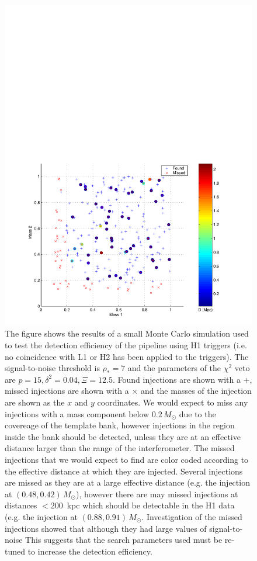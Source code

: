 \begin{figure}[p]
\begin{center}
\includegraphics[width=\textwidth]{figures/result/h1_inj_mass_7_0_delta_0_04_chisq_12_5}
\end{center}
\caption[Found and Missed H1 Injections for $\Xi = 12.5 \delta^2 = 0.04$]{%
\label{f:h1_missed_tuning}
The figure shows the results of a small Monte Carlo simulation used to test
the detection efficiency of the pipeline using H1 triggers (i.e. no
coincidence with L1 or H2 has been applied to the triggers). The
signal-to-noise threshold is $\rho_\ast = 7$ and the parameters of the
$\chi^2$ veto are $p = 15, \delta^2 = 0.04, \Xi = 12.5$. Found injections are
shown with a $+$, missed injections are shown with a $\times$ and the masses
of the injection are shown as the $x$ and $y$ coordinates. We would expect to
miss any injections with a mass component below $0.2\,M_\odot$ due to the
covereage of the template bank, however injections in the region inside the
bank should be detected, unless they are at an effective distance larger than
the range of the interferometer. The missed injections that we would expect to
find are color coded according to the effective distance at which they are
injected.  Several injections are missed as they are at a large effective
distance (e.g.  the injection at $(0.48,0.42)\,M_\odot$), however there are
may missed injections at distances $< 200$~kpc which should be detectable in
the H1 data (e.g. the injection at $(0.88,0.91)\,M_\odot$. Investigation of
the missed injections showed that although they had large values of
signal-to-noise This suggests that
the search parameters used must be re-tuned to increase the detection
efficiency.
}
\end{figure}

